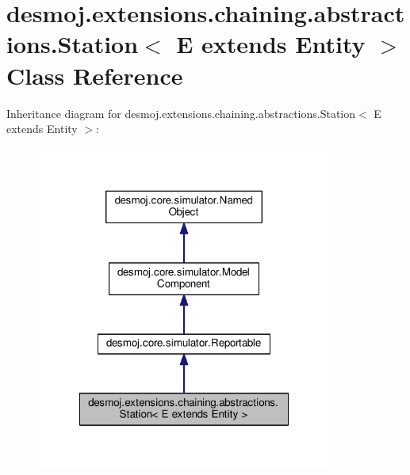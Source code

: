 \section{desmoj.\-extensions.\-chaining.\-abstractions.\-Station$<$ E extends Entity $>$ Class Reference}
\label{classdesmoj_1_1extensions_1_1chaining_1_1abstractions_1_1_station_3_01_e_01extends_01_entity_01_4}


Inheritance diagram for desmoj.\-extensions.\-chaining.\-abstractions.\-Station$<$ E extends Entity $>$\-:
\nopagebreak
\begin{figure}[H]
\begin{center}
\leavevmode
\includegraphics[width=276pt]{classdesmoj_1_1extensions_1_1chaining_1_1abstractions_1_1_station_3_01_e_01extends_01_entity_01_4__inherit__graph}
\end{center}
\end{figure}


